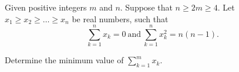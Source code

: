 Given positive integers $m$ and $n$. Suppose that $n \ge 2m \ge 4$. Let $x_1 \ge x_2 \ge \dots \ge x_n$ be real numbers, such that
\[ \sum_{k = 1}^n x_k = 0 \ \text{and} \ \sum_{k = 1}^n x_k^2 = n(n - 1).\]

Determine the minimum value of $\sum_{k = 1}^m x_k$.
